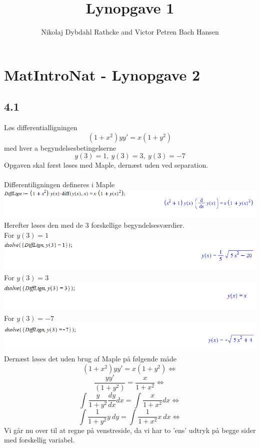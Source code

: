 \documentclass[12pt]{article}
\title{Lynopgave 1}
\author{Nikolaj Dybdahl Rathcke and Victor Petren Bach Hansen}
\begin{document}
\section*{MatIntroNat - Lynopgave 2}
\subsection*{4.1}
Løs differentialligningen
$$(1+x^2)yy\prime=x(1+y^2)$$
med hver a begyndelsesbetingelserne
$$y(3)=1,\:y(3)=3,\:y(3)=-7$$
Opgaven skal først løses med Maple, dernæst uden ved separation.\\
\\
Differentiligningen defineres i Maple\\
\includegraphics[scale=0.6]{41a1}\\
Herefter løses den med de 3 forskellige begyndelsesværdier.\\
For $y(3)=1$\\
\includegraphics[scale=0.6]{41a2}\\
For $y(3)=3$\\
\includegraphics[scale=0.6]{41a3}\\
For $y(3)=-7$\\
\includegraphics[scale=0.6]{41a4}\\
Dernæst løses det uden brug af Maple på følgende måde
$$(1+x^2)yy\prime=x(1+y^2)\Leftrightarrow$$
$$\dfrac{yy\prime}{(1+y^2)}=\dfrac{x}{1+x^2} \Leftrightarrow$$
$$\int \dfrac{y}{1+y^2}\dfrac{dy}{dx} dx = \int \dfrac{x}{1+x^2} dx \Leftrightarrow$$
$$\int \dfrac{1}{1+y^2} y \: dy = \int \dfrac{1}{1+x^2}x\: dx \Leftrightarrow$$
Vi går nu over til at regne på venstreside, da vi har to 'ens' udtryk på begge sider med forskellig variabel.\\
\end{document}

